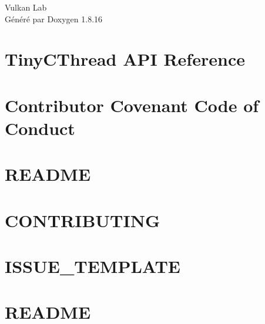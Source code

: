 \let\mypdfximage\pdfximage\def\pdfximage{\immediate\mypdfximage}\documentclass[twoside]{book}
\newcommand{\+}{\discretionary{\mbox{\scriptsize$\hookleftarrow$}}{}{}}
\newcommand{\clearemptydoublepage}{%
  \newpage{\pagestyle{empty}\cleardoublepage}%
}
\begin{document}
\hypersetup{pageanchor=false,
             bookmarksnumbered=true,
             pdfencoding=unicode
            }
\begin{titlepage}
\vspace*{7cm}
\begin{center}%
{\Large Vulkan Lab }\\
\vspace*{1cm}
{\large Généré par Doxygen 1.8.16}\\
\end{center}
\end{titlepage}
\clearemptydoublepage
{}
\tableofcontents
\clearemptydoublepage
{}
\hypersetup{pageanchor=true}

\chapter{Tiny\+C\+Thread A\+PI Reference}
\label{index}\hypertarget{index}{}
\chapter{Contributor Covenant Code of Conduct}
\label{md_CODE_OF_CONDUCT}

\chapter{R\+E\+A\+D\+ME}
\label{md_ext_nanogui_ext_enoki_ext_cub_README}

\chapter{C\+O\+N\+T\+R\+I\+B\+U\+T\+I\+NG}
\label{md_ext_nanogui_ext_enoki_ext_pybind11_CONTRIBUTING}

\chapter{I\+S\+S\+U\+E\+\_\+\+T\+E\+M\+P\+L\+A\+TE}
\label{md_ext_nanogui_ext_enoki_ext_pybind11_ISSUE_TEMPLATE}

\chapter{R\+E\+A\+D\+ME}
\label{md_ext_nanogui_ext_enoki_ext_pybind11_README}

\end{document}
